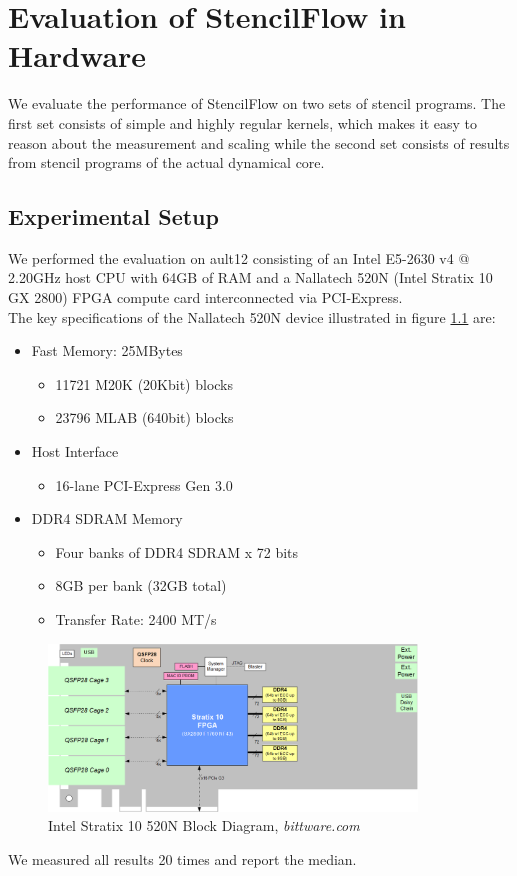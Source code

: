 \chapter{Evaluation of StencilFlow in Hardware}
We evaluate the performance of StencilFlow on two sets of stencil programs. The first set consists of simple and highly regular kernels, which makes it easy to reason about the measurement and scaling while the second set consists of results from stencil programs of the actual dynamical core.



\section{Experimental Setup}
We performed the evaluation on ault12 consisting of an Intel E5-2630 v4 @ 2.20GHz host CPU with 64GB of RAM and a Nallatech 520N (Intel Stratix 10 GX 2800) FPGA compute card interconnected via PCI-Express. \\
The key specifications of the Nallatech 520N device illustrated in figure \ref{fig:stratix-10} are:
\begin{itemize}
	\item Fast Memory: 25MBytes 
	\begin{itemize}
		\item 11721 M20K (20Kbit) blocks
		\item 23796 MLAB (640bit) blocks 
	\end{itemize}
	\item Host Interface
	\begin{itemize}
			\item 16-lane PCI-Express Gen 3.0 
	\end{itemize}
	\item DDR4 SDRAM Memory
	\begin{itemize}
		\item Four banks of DDR4 SDRAM x 72 bits
		\item 8GB per bank (32GB total)
		\item Transfer Rate: 2400 MT/s 
	\end{itemize}
\end{itemize}
\cite{label60}

\begin{figure}[h]
	\centering
	\includegraphics[height=12em]{images/520N.png}
	\caption{Intel Stratix 10 520N Block Diagram, \textit{bittware.com}}
	\label{fig:stratix-10}
\end{figure}
We measured all results 20 times and report the median.


